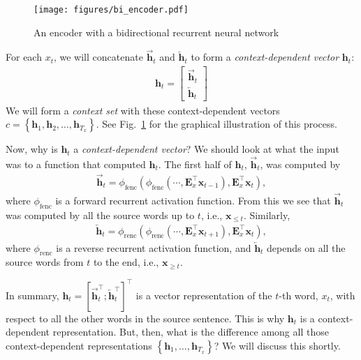 \documentclass{report}
\newcommand{\vect}[1]{\mathbf{#1}}
\newcommand{\matr}[1]{\mathbf{#1}}
\newcommand{\vh}[0]{\vect{h}}
\newcommand{\vx}[0]{\vect{x}}
\newcommand{\mE}[0]{\matr{E}}
\newcommand{\fenc}{\text{fenc}}
\newcommand{\renc}{\text{renc}}
\begin{document}
\begin{figure}[t]
    \centering
    \centering
    \texttt{[image: figures/bi\_encoder.pdf]}

    \caption{An encoder with a bidirectional recurrent neural network}
    \label{fig:bienc}
\end{figure}

For each $x_t$, we will concatenate $\overrightarrow{\vh}_t$ and
$\overleftarrow{\vh}_t$ to form a {\em context-dependent vector} $\vh_t$:
\begin{align}
    \label{eq:cd_rep}
    \vh_t = \left[ \begin{array}{c}
            \overrightarrow{\vh}_t \\
            \overleftarrow{\vh}_t
    \end{array} \right]
\end{align}
We will form a {\em context set} with these context-dependent vectors $c=\left\{
\vh_1, \vh_2, \ldots, \vh_{T_x}\right\}$. See Fig.~\ref{fig:bienc} for the
graphical illustration of this process.

Now, why is $\vh_t$ a {\em context-dependent vector}? We should look at what the
input was to a function that computed $\vh_t$. The first half of $\vh_t$,
$\overrightarrow{\vh}_t$, was computed by
\begin{align*}
    \overrightarrow{\vh}_t = \phi_{\fenc}\left( \phi_{\fenc}\left( \cdots,
    \mE_x^\top \vx_{t-1}\right), \mE_x^\top \vx_{t}\right),
\end{align*}
where $\phi_{\fenc}$ is a forward recurrent activation function. From this we
see that $\overrightarrow{\vh}_t$ was computed by all the source words up to
$t$,
i.e., $\vx_{\leq t}$. Similarly, 
\begin{align*}
    \overleftarrow{\vh}_t = \phi_{\renc}\left( \phi_{\renc}\left( \cdots,
    \mE_x^\top \vx_{t+1}\right), \mE_x^\top \vx_{t}\right),
\end{align*}
where $\phi_{\renc}$ is a reverse recurrent activation function, and
$\overleftarrow{\vh}_t$ depends on all the source words from $t$ to the end,
i.e., $\vx_{\geq t}$. 

In summary, $\vh_{t} =\left[ \overrightarrow{\vh}_t^\top;
\overleftarrow{\vh}_t^\top \right]^\top$ is a vector representation of the
$t$-th word, $x_t$, with respect to all the other words in the source sentence.
This is why $\vh_t$ is a context-dependent representation. But, then, what is
the difference among all those context-dependent representations $\left\{
    \vh_1, \ldots, \vh_{T_x}
\right\}$? We will discuss this shortly.
\end{document}
